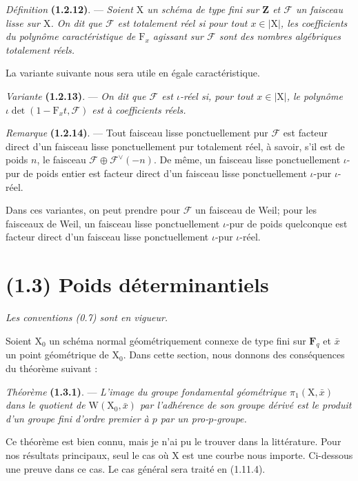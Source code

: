 \documentclass[11pt,leqno]{article}
\begin{document}
\textit{Définition} \textbf{(1.2.12)}. — \textit{Soient \(\mathrm{X}\) un schéma de type fini sur \(\mathbf{Z}\) et \(\mathscr{F}\) un faisceau lisse sur \(\mathrm{X}\). On dit que \(\mathscr{F}\) est \textup{totalement réel} si pour tout \(x\in|\mathrm{X}|\), les coefficients du polynôme caractéristique de \(\mathrm{F}_x\) agissant sur \(\mathscr{F}\) sont des nombres algébriques totalement réels.}

La variante suivante nous sera utile en égale caractéristique.

\textit{Variante} \textbf{(1.2.13)}. — \textit{On dit que \(\mathscr{F}\) est \(\iota\)-réel si, pour tout \(x\in|\mathrm{X}|\), le polynôme \(\iota\det(1-\mathrm{F}_xt,\mathscr{F})\) est à coefficients réels.}

\textit{Remarque} \textbf{(1.2.14)}. — Tout faisceau lisse ponctuellement pur \(\mathscr{F}\) est facteur direct d’un faisceau lisse ponctuellement pur totalement réel, à savoir, s’il est de poids \(n\), le faisceau \(\mathscr{F}\oplus\mathscr{F}^{\vee}(-n)\). De même, un faisceau lisse ponctuellement \(\iota\)-pur de poids entier est facteur direct d’un faisceau lisse ponctuellement \(\iota\)-pur \(\iota\)-réel.

Dans ces variantes, on peut prendre pour \(\mathscr{F}\) un faisceau de Weil; pour les faisceaux de Weil, un faisceau lisse ponctuellement \(\iota\)-pur de poids quelconque est facteur direct d’un faisceau lisse ponctuellement \(\iota\)-pur \(\iota\)-réel.

\section*{(1.3) Poids déterminantiels}

\textit{Les conventions \textup{(0.7)} sont en vigueur.}

Soient \(\mathrm{X}_0\) un schéma normal géométriquement connexe de type fini sur \(\mathbf{F}_q\) et \(\bar{x}\) un point géométrique de \(\mathrm{X}_0\). Dans cette section, nous donnons des conséquences du théorème suivant :

\textit{Théorème} \textbf{(1.3.1)}. — \textit{L’image du groupe fondamental géométrique \(\pi_1(\mathrm{X},\bar{x})\) dans le quotient de \(\mathrm{W}(\mathrm{X}_0,\bar{x})\) par l’adhérence de son groupe dérivé est le produit d’un groupe fini d’ordre premier à \(p\) par un pro-\(p\)-groupe.}

Ce théorème est bien connu, mais je n’ai pu le trouver dans la littérature. Pour nos résultats principaux, seul le cas où \(\mathrm{X}\) est une courbe nous importe. Ci-dessous une preuve dans ce cas. Le cas général sera traité en (1.11.4).
\end{document}
